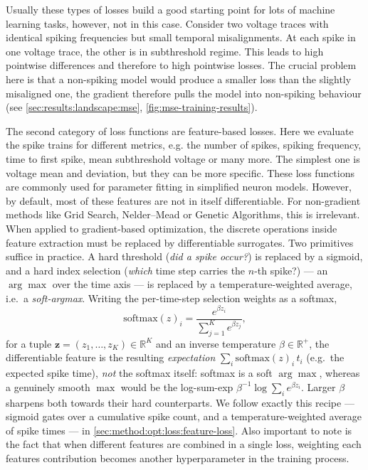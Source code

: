 Usually these types of losses build a good starting point for lots of machine learning tasks, however, not in this case.
Consider two voltage traces with identical spiking frequencies but small temporal misalignments.
At each spike in one voltage trace, the other is in subthreshold regime.
This leads to high pointwise differences and therefore to high pointwise losses.
The crucial problem here is that a non-spiking model would produce a smaller loss than the slightly misaligned one,
the gradient therefore pulls the model into non-spiking behaviour (see \cref{sec:results:landscape:mse}, \cref{fig:mse-training-results}).

The second category of loss functions are feature-based losses.
Here we evaluate the spike trains for different metrics, e.g. the number of spikes, spiking frequency, time to first spike, mean subthreshold voltage or many more.
The simplest one is voltage mean and deviation, but they can be more specific.
These loss functions are commonly used for parameter fitting in simplified neuron models.
However, by default, most of these features are not in itself differentiable.
For non-gradient methods like Grid Search, Nelder--Mead or Genetic Algorithms, this is irrelevant.
When applied to gradient-based optimization, the discrete operations inside feature extraction must be replaced by differentiable surrogates.
Two primitives suffice in practice.
A hard threshold (\emph{did a spike occur?}) is replaced by a sigmoid, and a hard index selection (\emph{which} time step carries the $n$-th spike?) --- an $\arg\max$ over the time axis --- is replaced by a temperature-weighted average, i.e.\ a \emph{soft-argmax}.
Writing the per-time-step selection weights as a softmax,
\begin{equation}\label{eq:softmax}
  \mathrm{softmax}(z)_i = \frac{e^{\beta z_i}}{\sum_{j=1}^{K} e^{\beta z_j}},
\end{equation}
for a tuple $\mathbf{z} = (z_1, \dots, z_K) \in \mathbb{R}^K$ and an inverse temperature $\beta \in \mathbb{R}^+$,
the differentiable feature is the resulting \emph{expectation} $\sum_i \mathrm{softmax}(z)_i\,t_i$ (e.g.\ the expected spike time), \emph{not} the softmax itself:
softmax is a soft $\arg\max$, whereas a genuinely smooth $\max$ would be the log-sum-exp $\beta^{-1}\log\sum_i e^{\beta z_i}$.
Larger $\beta$ sharpens both towards their hard counterparts.
We follow exactly this recipe --- sigmoid gates over a cumulative spike count, and a temperature-weighted average of spike times --- in \cref{sec:method:opt:loss:feature-loss}.
Also important to note is the fact that when different features are combined in a single loss, weighting each features contribution becomes another hyperparameter in the training process.

